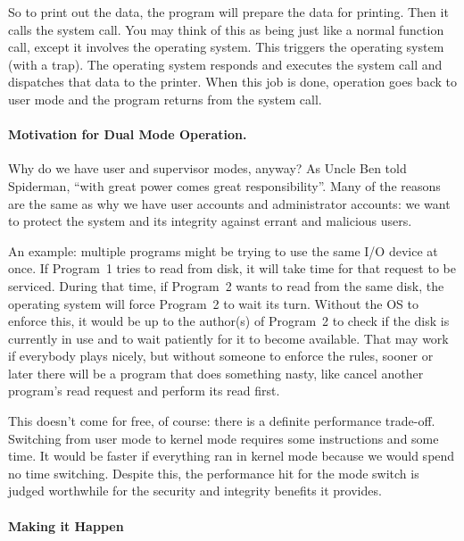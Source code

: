 So to print out the data, the program will prepare the data for printing. Then it calls the system call. You may think of this as being just like a normal function call, except it involves the operating system. This triggers the operating system (with a trap). The operating system responds and executes the system call and dispatches that data to the printer. When this job is done, operation goes back to user mode and the program returns from the system call.

\paragraph{Motivation for Dual Mode Operation.}

Why do we have user and supervisor modes, anyway? As Uncle Ben told Spiderman, ``with great power comes great responsibility''. Many of the reasons are the same as why we have user accounts and administrator accounts: we want to protect the system and its integrity against errant and malicious users.

An example: multiple programs might be trying to use the same I/O device at once. If Program~1 tries to read from disk, it will take time for that request to be serviced. During that time, if Program~2 wants to read from the same disk, the operating system will force Program~2 to wait its turn. Without the OS to enforce this, it would be up to the author(s) of Program~2 to check if the disk is currently in use and to wait patiently for it to become available. That may work if everybody plays nicely, but without someone to enforce the rules, sooner or later there will be a program that does something nasty, like cancel another program's read request and perform its read first.

This doesn't come for free, of course: there is a definite performance trade-off. Switching from user mode to kernel mode requires some instructions and some time. It would be faster if everything ran in kernel mode because we would spend no time switching. Despite this, the performance hit for the mode switch is judged worthwhile for the security and integrity benefits it provides.

\paragraph{Making it Happen}




